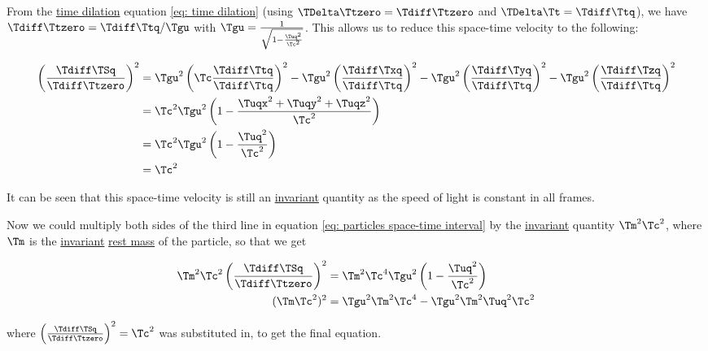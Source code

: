\begin{derivation}
	From the \hyperlink{def-time-dilation}{time dilation} equation \eqref{eq: time dilation} (using $\TDelta \Ttzero = \Tdiff \Ttzero$ and $\TDelta \Tt = \Tdiff \Ttq$), we have $\Tdiff \Ttzero  = \Tdiff \Ttq  / \Tgu  $ with $\Tgu  = \frac{1}{\sqrt{1-\frac{\Tuq ^2}{ \Tc ^2} } }$.
	This allows us to reduce this space-time velocity to the following:

	\begin{equation}
		\label{eq: particles space-time interval}
		\begin{aligned}
			\left(\frac{\Tdiff \TSq }{\Tdiff \Ttzero }\right)^2 & = \Tgu ^2\left(\Tc \frac{ { \Tdiff \Ttq  } }{ { \Tdiff \Ttq  } }\right)^2-\Tgu ^2\left(\frac{\Tdiff \Txq }{ { \Tdiff \Ttq  } }\right)^2-\Tgu ^2\left(\frac{\Tdiff \Tyq }{ { \Tdiff \Ttq  } }\right)^2-\Tgu ^2\left(\frac{\Tdiff \Tzq }{ { \Tdiff \Ttq  } }\right)^2 \\
			                                  & = \Tc ^2\Tgu ^2 \left( 1-\frac{ \Tuqx ^2 + \Tuqy ^2 + \Tuqz ^2}{ \Tc ^2} \right)                                                                                                                        \\
			                                  & = \Tc ^2\Tgu ^2 \left( 1-\frac{\Tuq ^2}{ \Tc ^2} \right)                                                                                                                                                             \\
			                                  & = \Tc ^2
		\end{aligned}
	\end{equation}


	It can be seen that this space-time velocity is still an \hyperlink{def-lorentz-invariant}{invariant} quantity as the speed of light is constant in all frames.

	Now we could multiply both sides of the third line in equation \eqref{eq: particles space-time interval} by the \hyperlink{def-lorentz-invariant}{invariant} quantity $\Tm ^2 \Tc ^2$, where $\Tm $ is the \hyperlink{def-lorentz-invariant}{invariant} \hyperlink{def-rest-mass}{rest mass} of the particle, so that we get

	\begin{equation}
		\begin{aligned}
			\Tm ^2 \Tc ^2 \left(\frac{\Tdiff \TSq }{\Tdiff \Ttzero }\right)^2 & = \Tm ^2 \Tc ^4 \Tgu ^2 \left( 1-\frac{\Tuq ^2}{ \Tc ^2} \right) \\
			( \Tm  \Tc ^2)^2                                & = \Tgu ^2 \Tm ^2 \Tc ^4-\Tgu ^2 \Tm ^2 \Tuq ^2 \Tc ^2
		\end{aligned}
	\end{equation}

	where $\left(\frac{\Tdiff \TSq }{\Tdiff \Ttzero }\right)^2= \Tc ^2$ was substituted in, to get the final equation.

\end{derivation}


